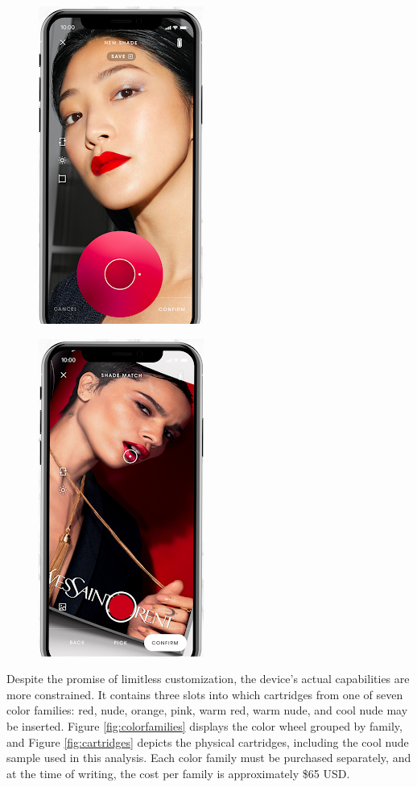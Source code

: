 \begin{figure}[H]
	\centering
	\includegraphics[scale=.7]{colorwheel}
	\caption{}
	\label{fig:colorwheel}
\end{figure}

\begin{figure}[H]
	\centering
	\includegraphics[scale=.7=]{colorselector}
	\caption{}
	\label{fig:colorselector}
\end{figure}

Despite the promise of limitless customization, the device’s actual capabilities are more constrained. It contains three slots into which cartridges from one of seven color families: red, nude, orange, pink, warm red, warm nude, and cool nude may be inserted. Figure \ref{fig:colorfamilies} displays the color wheel grouped by family, and Figure \ref{fig:cartridges} depicts the physical cartridges, including the cool nude sample used in this analysis. Each color family must be purchased separately, and at the time of writing, the cost per family is approximately \$65 USD.

